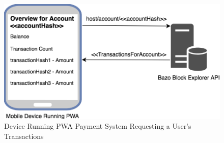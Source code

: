 \begin{figure}[h]
  \includegraphics[scale=0.4]{pwa_integration.png}
  \centering
  \caption{Device Running PWA Payment System Requesting a User's Transactions}
  \label{fig:pwa_api}
\end{figure}